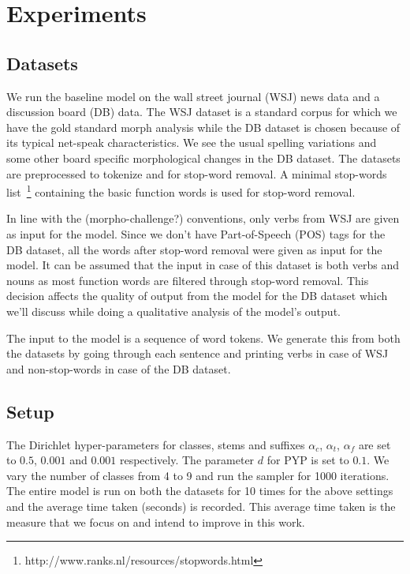 \documentclass{article}
\begin{document}
\section{Experiments}
\label{sec:experiments}

\subsection{Datasets}

We run the baseline model on the wall street journal (WSJ) news data 
and a discussion board (DB) data. The WSJ dataset is a standard corpus 
for which we have the gold standard morph analysis while the DB dataset 
is chosen because of its typical net-speak characteristics. We see 
the usual spelling variations and some other board specific morphological
 changes in the DB dataset. The datasets are preprocessed to tokenize 
and for stop-word removal. A minimal stop-words 
list~\footnote{http://www.ranks.nl/resources/stopwords.html} containing 
the basic function words is used for stop-word removal.

In line with the (morpho-challenge?) conventions, only verbs from WSJ 
are given as input for the model. Since we don't have Part-of-Speech (POS)
 tags for the DB dataset, all the words after stop-word removal were 
given as input for the model. It can be assumed that the input in case of 
this dataset is both verbs and nouns as most function words are filtered 
through stop-word removal. This decision affects the quality of output 
from the model for the DB dataset which we'll discuss while doing a 
qualitative analysis of the model's output.

The input to the model is a sequence of word tokens. We generate this 
from both the datasets by going through each sentence and printing verbs 
in case of WSJ and non-stop-words in case of the DB dataset.

\subsection{Setup}

The Dirichlet hyper-parameters for classes, stems and suffixes 
$\alpha_{c}$, $\alpha_{t}$, $\alpha_{f}$ are set to 
$0.5$, $0.001$ and $0.001$ respectively. The parameter $d$ for PYP is set 
to $0.1$.
We vary the number of classes from 4 to 9 and run the sampler for 1000 
iterations. The entire model is run on both the datasets for 10 times 
for the above settings and the average time taken (seconds) is recorded.
This average time taken is the measure that we focus on and intend to 
improve in this work.
\end{document}
